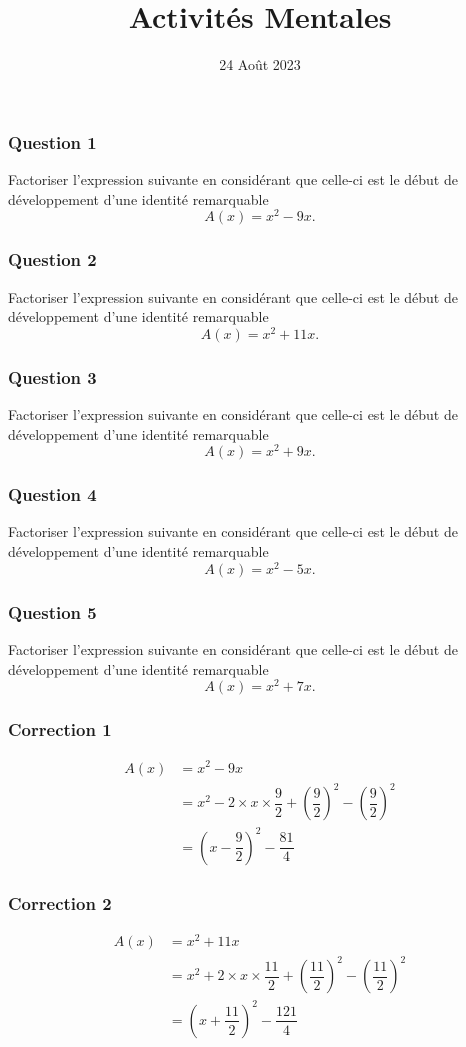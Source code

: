 \documentclass[15pt, mathserif]{beamer}
\title{Activités Mentales}
\date{24 Août 2023}
\begin{document}
\begin{frame}
    \titlepage
\end{frame}

\begin{frame} 
	\frametitle{Question 1}
Factoriser l'expression suivante en considérant que celle-ci est le début de développement d'une identité remarquable \[A(x) = x^2-9x.\]\end{frame}


\begin{frame} 
	\frametitle{Question 2}
Factoriser l'expression suivante en considérant que celle-ci est le début de développement d'une identité remarquable \[A(x) = x^2+11x.\]\end{frame}


\begin{frame} 
	\frametitle{Question 3}
Factoriser l'expression suivante en considérant que celle-ci est le début de développement d'une identité remarquable \[A(x) = x^2+9x.\]\end{frame}


\begin{frame} 
	\frametitle{Question 4}
Factoriser l'expression suivante en considérant que celle-ci est le début de développement d'une identité remarquable \[A(x) = x^2-5x.\]\end{frame}


\begin{frame} 
	\frametitle{Question 5}
Factoriser l'expression suivante en considérant que celle-ci est le début de développement d'une identité remarquable \[A(x) = x^2+7x.\]\end{frame}


\begin{frame}
\vspace{-10mm}
	\frametitle{Correction 1}
\begin{align*} A(x) &= x^2-9x\\ 
&=x^2-2\times x \times \dfrac{9}{2}+\left(\dfrac{9}{2}\right)^2- \left(\dfrac{9}{2}\right)^2\\ 
&=\left( x-\dfrac{9}{2}\right)^2-\dfrac{81}{4}
 \end{align*} 

 \bigskip\end{frame}


\begin{frame}
\vspace{-10mm}
	\frametitle{Correction 2}
\begin{align*} A(x) &= x^2+11x\\ 
&=x^2+2\times x \times \dfrac{11}{2}+\left(\dfrac{11}{2}\right)^2- \left(\dfrac{11}{2}\right)^2\\ 
&=\left( x+\dfrac{11}{2}\right)^2-\dfrac{121}{4}
 \end{align*} 

 \bigskip\end{frame}
\end{document}
